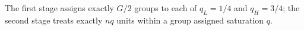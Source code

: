 The first stage assigns exactly \(G/2\) groups to each of \(q_L=1/4\) and \(q_H=3/4\); the second stage treats exactly \(nq\) units within a group assigned saturation \(q\).